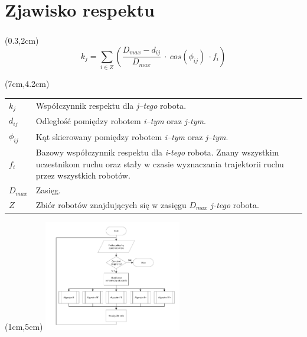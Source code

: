 \documentclass{beamer}
\begin{document}
\section{Zjawisko respektu}
\begin{frame}
\frametitle{\secname}

\begin{textblock*}{5cm}(0.3\linewidth,2cm) %
	\begin{equation*}
	k_j = \sum_{i \in Z}  \left(   \frac{D_{max} - d_{ij}}{D_{max}} ~ \cdot ~ cos(\phi_{ij}) ~ \cdot f_i \right)
	\end{equation*}
\end{textblock*}

\begin{textblock*}{5cm}(7cm,4.2cm) %
	\scriptsize{
		\begin{tabular}{lp{}}
			$ k_j $       	& Współczynnik respektu dla \textit{j--tego} robota. \\
			$ d_{ij} $    	& Odległość pomiędzy robotem \textit{i--tym} oraz \textit{j-tym}. \\
			$ \phi_{ij} $ 	& Kąt skierowany pomiędzy robotem \textit{i--tym} oraz \textit{j--tym}. \\
			$ f_i $ 		& Bazowy współczynnik respektu dla \textit{i-tego} robota. Znany wszystkim uczestnikom ruchu oraz stały w czasie wyznaczania trajektorii ruchu przez wszystkich robotów. \\
			$ D_{max} $ 	& Zasięg.  \\
			$ Z $ 			& Zbiór robotów znajdujących się w zasięgu $ D_{max} $ \textit{j-tego} robota.	
	\end{tabular}}
\end{textblock*}

\begin{textblock*}{6cm}(1cm,5cm) %
	\includegraphics[page=5,width=6cm]{img/hybrid_algorithm.pdf}
\end{textblock*}

\end{frame}
\end{document}
